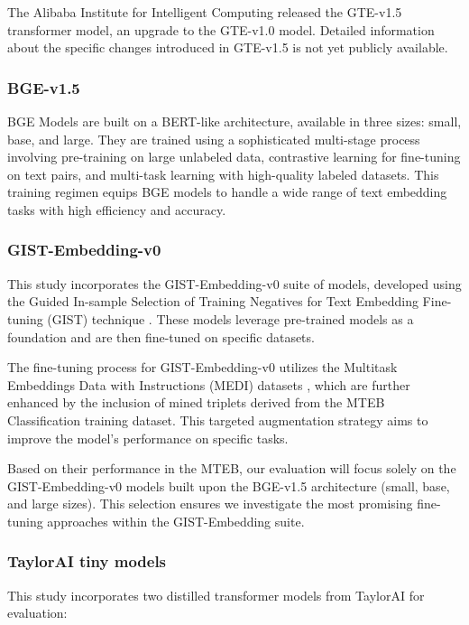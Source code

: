 The Alibaba Institute for Intelligent Computing released the \ac{GTE}-v1.5 transformer model, an upgrade to the \ac{GTE}-v1.0 model.
Detailed information about the specific changes introduced in \ac{GTE}-v1.5 is not yet publicly available.

\subsubsection{\ac{BGE}-v1.5} \label{model:bge}
\ac{BGE} Models \cite{xiao2024cpack} are built on a \ac{BERT}-like architecture, available in three sizes: small, base, and large.
They are trained using a sophisticated multi-stage process involving pre-training on large unlabeled data, contrastive learning for fine-tuning on text pairs, and multi-task learning with high-quality labeled datasets.
This training regimen equips \ac{BGE} models to handle a wide range of text embedding tasks with high efficiency and accuracy.

\subsubsection{GIST-Embedding-v0}
This study incorporates the GIST-Embedding-v0 suite of models, developed using the Guided In-sample Selection of Training Negatives for Text Embedding Fine-tuning (GIST) technique \cite{solatorio2024gistembed}.
These models leverage pre-trained models as a foundation and are then fine-tuned on specific datasets.

The fine-tuning process for GIST-Embedding-v0 utilizes the Multitask Embeddings Data with Instructions (MEDI) datasets \cite{su2023embedder}, which are further enhanced by the inclusion of mined triplets derived from the \ac{MTEB} Classification training dataset.
This targeted augmentation strategy aims to improve the model's performance on specific tasks.

Based on their performance in the \ac{MTEB}, our evaluation will focus solely on the GIST-Embedding-v0 models built upon the \ac{BGE}-v1.5 architecture (small, base, and large sizes).
This selection ensures we investigate the most promising fine-tuning approaches within the GIST-Embedding suite.

\subsubsection{TaylorAI tiny models} \label{model:taylorai}
This study incorporates two distilled transformer models from TaylorAI for evaluation:

